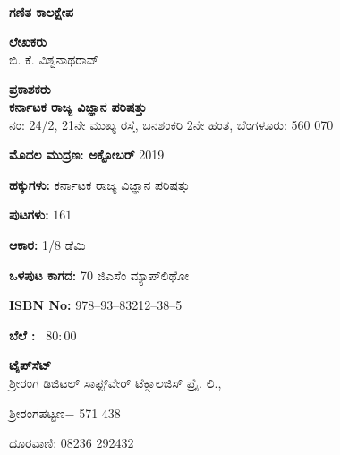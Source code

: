~
\thispagestyle{empty}

\vfill

\begin{center}
{\Large\bfseries ಗಣಿತ ಕಾಲಕ್ಷೇಪ}\\

\smallskip
\smallskip
\smallskip

{\bfseries ಲೇಖಕರು}\\[0.1cm]
ಬಿ. ಕೆ. ವಿಶ್ವನಾಥರಾವ್\\


\vfill

\smallskip

{\bfseries ಪ್ರಕಾಶಕರು}\\[0.1cm]
{\large\bfseries ಕರ್ನಾಟಕ ರಾಜ್ಯ ವಿಜ್ಞಾನ ಪರಿಷತ್ತು}\\
ನಂ: {\rm 24/2}, {\rm 21}ನೇ ಮುಖ್ಯ ರಸ್ತೆ, ಬನಶಂಕರಿ {\rm 2}ನೇ ಹಂತ, ಬೆಂಗಳೂರು: {\rm 560 070}
\end{center}

\vfill

\begin{center}
{\bfseries ಮೊದಲ ಮುದ್ರಣ: ಅಕ್ಟೋಬರ್ } {\rm 2019}

\vfill

{\bfseries ಹಕ್ಕುಗಳು:} ಕರ್ನಾಟಕ ರಾಜ್ಯ ವಿಜ್ಞಾನ ಪರಿಷತ್ತು 

\vfill

{\bfseries ಪುಟಗಳು:} {\rm $161$}

\vfill

{\bfseries ಆಕಾರ:} {\rm 1/8} ಡೆಮಿ

\vfill

{\bfseries ಒಳಪುಟ ಕಾಗದ:} {\rm 70} ಜಿಎಸೆಂ ಮ್ಯಾಪ್‌ಲಿಥೋ 

\vfill

 {\rm {\bfseries ISBN No:}} {\rm 978$–$93$–$83212$–$38$–$5}

\vfill


{\bfseries ಬೆಲೆ :} \rupee \ {\rm $80:00$}

\vfill

{\bfseries ಟೈಪ್‌ಸೆಟ್}\\
 ಶ್ರೀರಂಗ ಡಿಜಿಟಲ್ ಸಾಫ್ಟ್‌ವೇರ್ ಟೆಕ್ನಾಲಜಿಸ್ ಪ್ರೈ. ಲಿ.,

ಶ್ರೀರಂಗಪಟ್ಟಣ$-$ {\rm 571 438}

\smallskip

ದೂರವಾಣಿ: {\rm 08236 292432}

\vfill

\end{center}
